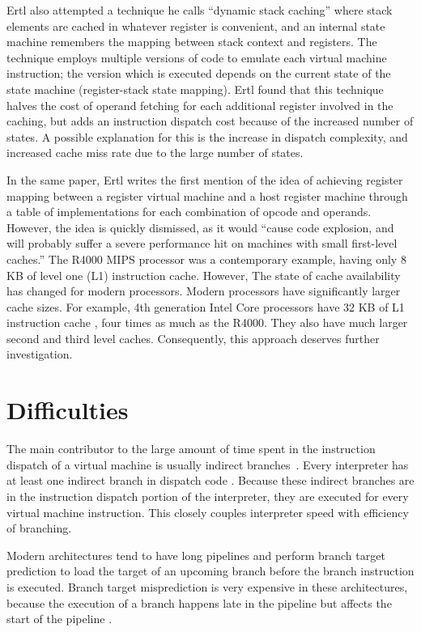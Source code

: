 		Ertl also attempted a technique he calls ``dynamic stack caching'' where stack elements are cached in whatever register is convenient, and an internal state machine remembers the mapping between stack context and registers. The technique employs multiple versions of code to emulate each virtual machine instruction; the version which is executed depends on the current state of the state machine (register-stack state mapping). Ertl found that this technique halves the cost of operand fetching for each additional register involved in the caching, but adds an instruction dispatch cost because of the increased number of states. A possible explanation for this is the increase in dispatch complexity, and increased cache miss rate due to the large number of states.
		
		In the same paper, Ertl writes the first mention of the idea of achieving register mapping between a register virtual machine and a host register machine through a table of implementations for each combination of opcode and operands. However, the idea is quickly dismissed, as it would ``cause code explosion, and will probably suffer a severe performance hit on machines with small first-level caches.'' The R4000 MIPS processor was a contemporary example, having only 8 KB of level one (L1) instruction cache. However, The state of cache availability has changed for modern processors. Modern processors have significantly larger cache sizes. For example, 4th generation Intel Core processors have 32 KB of L1 instruction cache \citep{optimisationreference}, four times as much as the R4000. They also have much larger second and third level caches. Consequently, this approach deserves further investigation.

	\section{Difficulties}
		The main contributor to the large amount of time spent in the instruction dispatch of a virtual machine is usually  indirect branches~\citep{optimizingindirectbranch}. Every interpreter has at least one indirect branch in dispatch code \citep{modernarchvm}. Because these indirect branches are in the instruction dispatch portion of the interpreter, they are executed for every virtual machine instruction. This closely couples interpreter speed with efficiency of branching.
		
		Modern architectures tend to have long pipelines and perform branch target prediction to load the target of an upcoming branch before the branch instruction is executed. Branch target misprediction is very expensive in these architectures, because the execution of a branch happens late in the pipeline but affects the start of the pipeline \citep{optimizingindirectbranch}.
				
